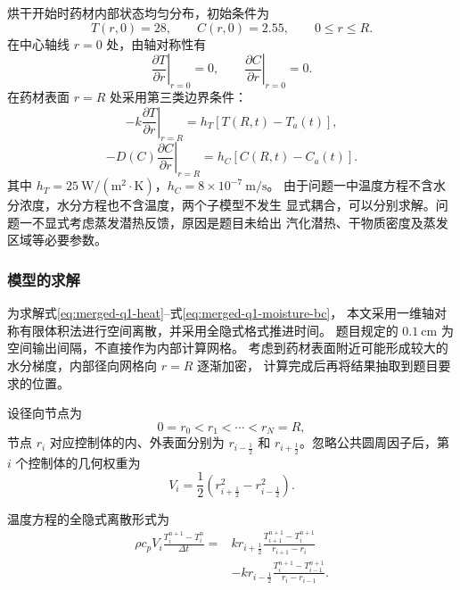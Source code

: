 \documentclass[12pt,a4paper]{article}
\begin{document}
烘干开始时药材内部状态均匀分布，初始条件为
\begin{equation}
T(r,0)=28,\qquad C(r,0)=2.55,
\qquad 0\le r\le R.
\label{eq:merged-q1-initial}
\end{equation}
在中心轴线 $r=0$ 处，由轴对称性有
\begin{equation}
\left.\frac{\partial T}{\partial r}\right|_{r=0}=0,
\qquad
\left.\frac{\partial C}{\partial r}\right|_{r=0}=0.
\label{eq:merged-q1-center}
\end{equation}
在药材表面 $r=R$ 处采用第三类边界条件：
\begin{equation}
-k\left.\frac{\partial T}{\partial r}\right|_{r=R}
=h_T\left[T(R,t)-T_a(t)\right],
\label{eq:merged-q1-heat-bc}
\end{equation}
\begin{equation}
-D(C)\left.\frac{\partial C}{\partial r}\right|_{r=R}
=h_C\left[C(R,t)-C_a(t)\right].
\label{eq:merged-q1-moisture-bc}
\end{equation}
其中 $h_T=25\ \mathrm{W/(m^2\cdot K)}$，$h_C=8\times10^{-7}\ \mathrm{m/s}$。
由于问题一中温度方程不含水分浓度，水分方程也不含温度，两个子模型不发生
显式耦合，可以分别求解。问题一不显式考虑蒸发潜热反馈，原因是题目未给出
汽化潜热、干物质密度及蒸发区域等必要参数。

\subsubsection{模型的求解}

为求解式\eqref{eq:merged-q1-heat}--式\eqref{eq:merged-q1-moisture-bc}，
本文采用一维轴对称有限体积法进行空间离散，并采用全隐式格式推进时间。
题目规定的 $0.1\ \mathrm{cm}$ 为空间输出间隔，不直接作为内部计算网格。
考虑到药材表面附近可能形成较大的水分梯度，内部径向网格向 $r=R$ 逐渐加密，
计算完成后再将结果抽取到题目要求的位置。

设径向节点为
\begin{equation}
0=r_0<r_1<\cdots<r_N=R,
\end{equation}
节点 $r_i$ 对应控制体的内、外表面分别为 $r_{i-\frac12}$ 和
$r_{i+\frac12}$。忽略公共圆周因子后，第 $i$ 个控制体的几何权重为
\begin{equation}
V_i=\frac12\left(r_{i+\frac12}^2-r_{i-\frac12}^2\right).
\label{eq:merged-q1-volume}
\end{equation}

温度方程的全隐式离散形式为
\begin{equation}
\begin{aligned}
\rho c_pV_i\frac{T_i^{n+1}-T_i^n}{\Delta t}
={}&kr_{i+\frac12}
\frac{T_{i+1}^{n+1}-T_i^{n+1}}{r_{i+1}-r_i}\\
&-kr_{i-\frac12}
\frac{T_i^{n+1}-T_{i-1}^{n+1}}{r_i-r_{i-1}}.
\end{aligned}
\label{eq:merged-q1-heat-fvm}
\end{equation}
\end{document}
